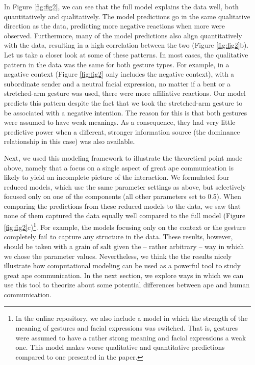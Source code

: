 \documentclass[
  man,floatsintext]{apa6}
\begin{document}
In Figure \ref{fig:fig2}, we can see that the full model explains the data well, both quantitatively and qualitatively. The model predictions go in the same qualitative direction as the data, predicting more negative reactions when more were observed. Furthermore, many of the model predictions also align quantitatively with the data, resulting in a high correlation between the two (Figure \ref{fig:fig2}b). Let us take a closer look at some of these patterns. In most cases, the qualitative pattern in the data was the same for both gesture types. For example, in a negative context (Figure \ref{fig:fig2} only includes the negative context), with a subordinate sender and a neutral facial expression, no matter if a bent or a stretched-arm gesture was used, there were more affiliative reactions. Our model predicts this pattern despite the fact that we took the stretched-arm gesture to be associated with a negative intention. The reason for this is that both gestures were assumed to have weak meanings. As a consequence, they had very little predictive power when a different, stronger information source (the dominance relationship in this case) was also available.

Next, we used this modeling framework to illustrate the theoretical point made above, namely that a focus on a single aspect of great ape communication is likely to yield an incomplete picture of the interaction. We formulated four reduced models, which use the same parameter settings as above, but selectively focused only on one of the components (all other parameters set to 0.5). When comparing the predictions from these reduced models to the data, we saw that none of them captured the data equally well compared to the full model (Figure \ref{fig:fig2}c)\footnote{In the online repository, we also include a model in which the strength of the meaning of gestures and facial expressions was switched. That is, gestures were assumed to have a rather strong meaning and facial expressions a weak one. This model makes worse qualitative and quantitative predictions compared to one presented in the paper.}. For example, the models focusing only on the context or the gesture completely fail to capture any structure in the data. These results, however, should be taken with a grain of salt given the -- rather arbitrary -- way in which we chose the parameter values. Nevertheless, we think the the results nicely illustrate how computational modeling can be used as a powerful tool to study great ape communication. In the next section, we explore ways in which we can use this tool to theorize about some potential differences between ape and human communication.
\end{document}
